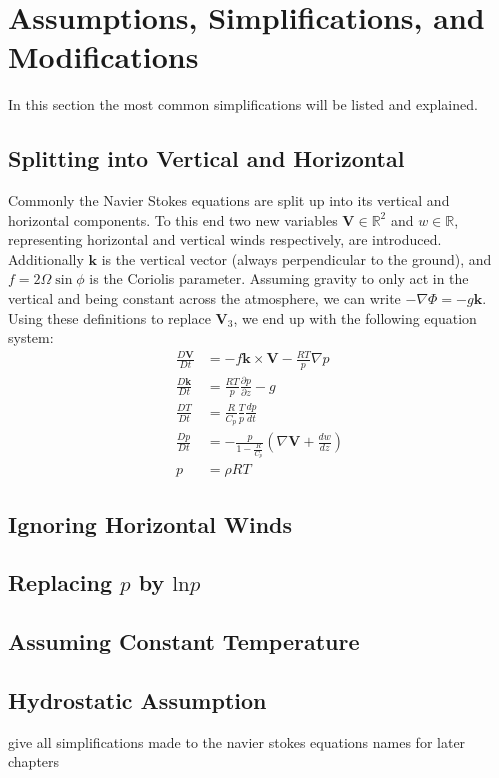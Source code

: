 \section{Assumptions, Simplifications, and Modifications}
In this section the most common simplifications will be listed and explained.

\subsection{Splitting into Vertical and Horizontal}
Commonly the Navier Stokes equations are split up into its vertical and horizontal components.
To this end two new variables $\textbf{V} \in \mathbb{R}^2$ and $w\in \mathbb{R}$, representing horizontal and vertical winds respectively, are introduced.
Additionally $\boldsymbol{k}$ is the vertical vector (always perpendicular to the ground), and $f=2\Omega \sin \phi$ is the Coriolis parameter.
Assuming gravity to only act in the vertical and being constant across the atmosphere, we can write $-\nabla \Phi = -g \boldsymbol{k}$.
Using these definitions to replace $\textbf{V}_3$, we end up with the following equation system:
\begin{align*}
\frac{D\textbf{V}}{Dt} &= -f\boldsymbol{k} \times \textbf{V} - \frac{RT}{p}\nabla p\\
\frac{D\boldsymbol{k}}{Dt} &= \frac{RT}{p} \frac{\partial p}{\partial z} - g \\
\frac{DT}{Dt} &= \frac{R}{C_p}\frac{T}{p}\frac{dp}{dt}\\
\frac{Dp}{Dt} &= -\frac{p}{1- \frac{R}{C_p}} (\nabla \textbf{V} + \frac{dw}{dz})\\
p &= \rho R T
\end{align*}
\subsection{Ignoring Horizontal Winds}
\subsection{Replacing $p$ by $\text{ln}p$}
\subsection{Assuming Constant Temperature}
\subsection{Hydrostatic Assumption}
give all simplifications made to the navier stokes equations names for later chapters

